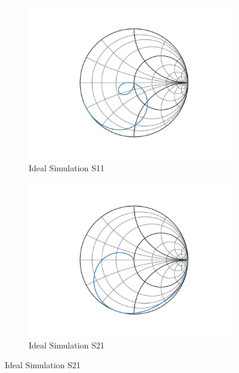\documentclass[letterpaper,12pt]{article}
\begin{document}
\begin{figure}[H]
    \begin{subfigure}[t]{.49\textwidth}
      \centering
      \includegraphics[width=\linewidth]{figures/8.s11.ideal}
      \caption{Ideal Simulation S11}
    \end{subfigure}
    \hfill
    \begin{subfigure}[t]{.49\textwidth}
      \centering
      \includegraphics[width=\linewidth]{figures/8.s21.ideal}
      \caption{Ideal Simulation S21}
    \end{subfigure}
    

\end{figure}
\end{document}
